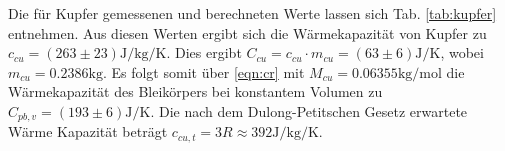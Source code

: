 Die für Kupfer gemessenen und berechneten Werte lassen sich Tab.
\ref{tab:kupfer} entnehmen. Aus diesen Werten ergibt sich die Wärmekapazität
von Kupfer zu $c_{cu} = (263 \pm 23) \si{\joule \per \kilo \gram \per\kelvin}$.
Dies ergibt $C_{cu} = c_{cu} \cdot m_{cu} = (63 \pm 6)\si{\joule\per\kelvin}$,
wobei $m_{cu} =0.2386 \si{\kilo\gram}$. Es folgt somit über \eqref{eqn:cr}
mit $M_{cu} = 0.06355 \si{\kilo \gram \per \mole}$ \cite{Molmasse} die
Wärmekapazität des Bleikörpers bei konstantem Volumen zu
$C_{pb,v}=(193 \pm 6) \si{\joule \per \kelvin}$. Die nach dem Dulong-Petitschen
Gesetz erwartete Wärme Kapazität beträgt
$c_{cu,t} = 3 R \approx 392 \si{\joule \per \kilo \gram \per\kelvin}$.

